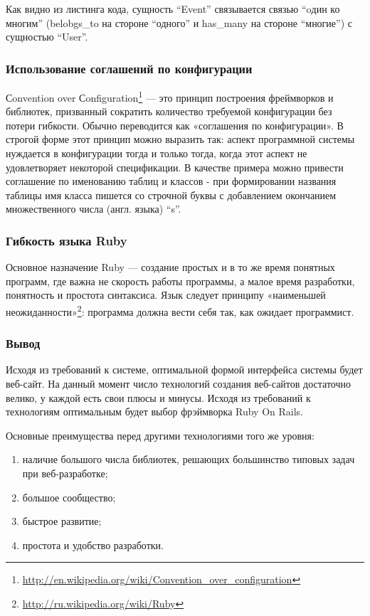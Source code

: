 Как видно из листинга кода, сущность ``Event'' связывается связью ``oдин ко
многим'' (belobgs\_to на стороне ``одного'' и has\_many на стороне ``многие'') с сущностью
``User''.

\subsubsection{Использование соглашений по конфигурации}
Сonvention over Сonfiguration\footnote{
	\url{http://en.wikipedia.org/wiki/Convention_over_configuration}
} — это принцип построения фреймворков и
библиотек, призванный сократить количество требуемой конфигурации без потери гибкости.
Обычно переводится как «соглашения по конфигурации».
В строгой форме этот принцип можно выразить так: аспект программной системы
нуждается в конфигурации тогда и только тогда, когда этот аспект не
удовлетворяет некоторой спецификации.
В качестве примера можно привести соглашение по именованию таблиц и классов -
при формировании названия таблицы имя класса пишется со строчной буквы с
добавлением окончанием множественного числа (англ. языка) “s”.

\subsubsection{Гибкость языка Ruby}
Основное назначение Ruby — создание простых и в то же время понятных программ,
где важна не скорость работы программы, а малое время разработки, понятность и
простота синтаксиса. Язык следует принципу «наименьшей неожиданности»\footnote{
	\url{http://ru.wikipedia.org/wiki/Ruby}
}: программа должна вести себя так, как ожидает программист.

\subsubsection{Вывод}
Исходя из требований к системе, оптимальной формой интерфейса системы будет
веб-сайт. На данный момент число технологий создания веб-сайтов достаточно
велико, у каждой есть свои плюсы и минусы. Исходя из требований к технологиям
оптимальным будет выбор фрэймворка Ruby On Rails.

Основные преимущества перед другими технологиями того же уровня:
\begin{enumerate}
  \item наличие большого числа библиотек, решающих большинство типовых задач при веб-разработке;
  \item большое сообщество;
  \item быстрое развитие;
  \item простота и удобство разработки. 
\end{enumerate}


